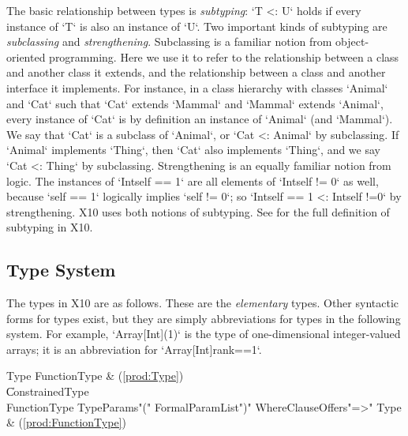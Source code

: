 The basic relationship between types is {\em subtyping}: \xcd`T <: U`
holds if every instance of \xcd`T` is also an instance of \xcd`U`. Two
important kinds of subtyping are {\em subclassing} and {\em
  strengthening}. Subclassing is a familiar notion from
object-oriented programming. Here we use it to refer to the
relationship between a class and another class it extends, and the
relationship between a class and another interface it implements. For
instance, in a class hierarchy with classes \xcd`Animal` and \xcd`Cat`
such that \xcd`Cat` extends \xcd`Mammal` and \xcd`Mammal` extends
\xcd`Animal`, every instance of \xcd`Cat` is by definition an instance
of \xcd`Animal` (and \xcd`Mammal`). We say that \xcd`Cat` is a
subclass of \xcd`Animal`, or \xcd`Cat <: Animal` by subclassing. If
\xcd`Animal` implements \xcd`Thing`, then \xcd`Cat` also implements
\xcd`Thing`, and we say \xcd`Cat <: Thing` by subclassing.
Strengthening is an equally familiar notion from logic.  The instances
of \xcd`Int{self == 1}` are all elements of \xcd`Int{self != 0}` as well,
because \xcd`self == 1` logically implies \xcd`self != 0`; so 
\xcd`Int{self  == 1} <: Int{self !=0}` by strengthening.  X10 uses both notions
of subtyping.  See  for the full definition
of subtyping in X10.

\subsection{Type System}
The types in X10 are as follows.  
These are the {\em elementary} types. Other
syntactic forms for types exist, but they are simply abbreviations for types
in the following system.  For example, \xcd`Array[Int](1)` is the type of
one-dimensional integer-valued arrays; it is an abbreviation for
\xcd`Array[Int]{rank==1}`.\\


\begin{bbgrammar}
 Type   \: FunctionType & (\ref{prod:Type})\\
    \| ConstrainedType\\
 FunctionType   \: TypeParams\opt \xcd"(" FormalParamList\opt \xcd")" WhereClause\opt Offers\opt \xcd"=>" Type & (\ref{prod:FunctionType})\\

\end{bbgrammar}

